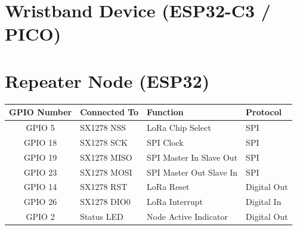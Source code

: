 \section{Wristband Device (ESP32-C3 / PICO)}
\begin{table}[htbp]
    \centering
\end{table}

\section{Repeater Node (ESP32)}
\begin{table}[htbp]
    \centering
    \begin{tabular}{clll}
        \toprule
        \textbf{GPIO Number} & \textbf{Connected To} & \textbf{Function} & \textbf{Protocol} \\
        \midrule
        GPIO 5  & SX1278 NSS & LoRa Chip Select & SPI \\
        GPIO 18 & SX1278 SCK & SPI Clock & SPI \\
        GPIO 19 & SX1278 MISO & SPI Master In Slave Out & SPI \\
        GPIO 23 & SX1278 MOSI & SPI Master Out Slave In & SPI \\
        GPIO 14 & SX1278 RST & LoRa Reset & Digital Out \\
        GPIO 26 & SX1278 DIO0 & LoRa Interrupt & Digital In \\
        GPIO 2  & Status LED & Node Active Indicator & Digital Out \\
        \bottomrule
    \end{tabular}
\end{table}


